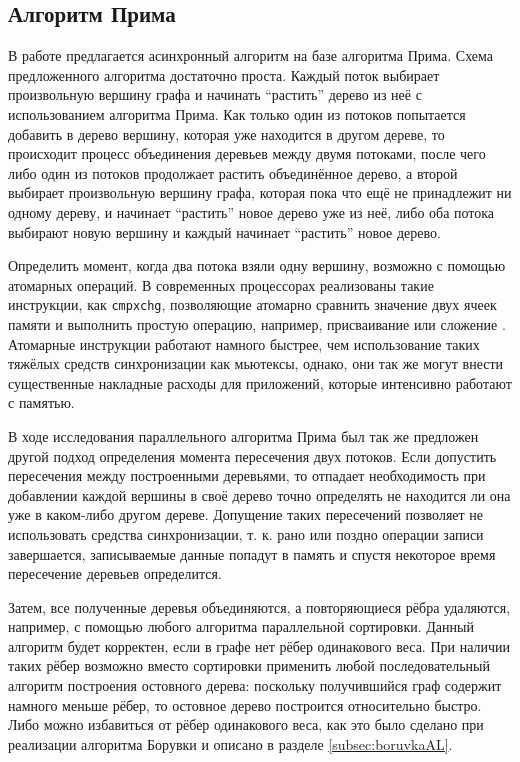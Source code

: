 \documentclass[a4paper,12pt]{extarticle}
\begin{document}
\subsection{Алгоритм Прима}
\label{subsec:algoPrim}

В работе \cite{boruvka-prima} предлагается асинхронный алгоритм на базе алгоритма Прима.
Схема предложенного алгоритма достаточно проста.
Каждый поток выбирает произвольную вершину графа и начинать ``растить'' дерево из  неё с использованием алгоритма Прима.
Как только один из потоков попытается добавить в дерево вершину, которая уже находится в другом дереве, то происходит процесс объединения деревьев между двумя потоками, после чего либо один из потоков продолжает растить объединённое дерево, а второй выбирает произвольную вершину графа, которая пока что ещё не принадлежит ни одному дереву, и начинает ``растить'' новое дерево уже из неё, либо оба потока выбирают новую вершину и каждый начинает ``растить'' новое дерево.

Определить момент, когда два потока взяли одну вершину, возможно с помощью атомарных операций.
В современных процессорах реализованы такие инструкции, как \texttt{cmpxchg}, позволяющие атомарно сравнить значение двух ячеек памяти и выполнить простую операцию, например, присваивание или сложение \cite{intel-cmpxchg}.
Атомарные инструкции работают намного быстрее, чем использование таких тяжёлых средств синхронизации как мьютексы, однако, они так же могут внести существенные накладные расходы для приложений, которые интенсивно работают с памятью.

В ходе исследования параллельного алгоритма Прима был так же предложен другой подход определения момента пересечения двух потоков.
Если допустить пересечения между построенными деревьями, то отпадает необходимость при добавлении каждой вершины в своё дерево точно определять не находится ли она уже в каком-либо другом дереве.
Допущение таких пересечений позволяет не использовать средства синхронизации, т. к. рано или поздно операции записи завершается, записываемые данные попадут в память и спустя некоторое время пересечение деревьев определится.

Затем, все полученные деревья объединяются, а повторяющиеся рёбра удаляются, например, с помощью любого алгоритма параллельной сортировки.
Данный алгоритм будет корректен, если в графе нет рёбер одинакового веса.
При наличии таких рёбер возможно вместо сортировки применить любой последовательный алгоритм построения остовного дерева: поскольку получившийся граф содержит намного меньше рёбер, то остовное дерево построится относительно быстро.
Либо можно избавиться от рёбер одинакового веса, как это было сделано при реализации алгоритма Борувки и описано в разделе \ref{subsec:boruvkaAL}.
\end{document}
